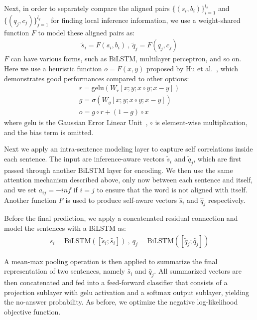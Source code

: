 \documentclass[letterpaper]{article} \usepackage{aaai19}  \usepackage{times}  \usepackage{helvet}  \usepackage{courier}  \usepackage{url}  \usepackage{graphicx}  \usepackage{pbox}
\begin{document}
Next, in order to separately compare the aligned pairs $\{(s_i, b_i)\}_{i=1}^{l_s}$ and $\{(q_j, c_j)\}_{j=1}^{l_q}$ for finding local inference information, we use a weight-shared function $F$ to model these aligned pairs as:
\begin{gather}
	\tilde{s}_i = F(s_i, b_i) \ , \
	\tilde{q}_j = F(q_j, c_j) \nonumber
\end{gather}
$F$ can have various forms, such as BiLSTM, multilayer perceptron, and so on. 
Here we use a heuristic function $o=F(x,y)$ proposed by Hu et al.~, which demonstrates good performances compared to other options:
\begin{gather}
r = \mathrm{gelu} \left(W_r [x; y; x \circ y; x - y] \right) \nonumber \\
g = \sigma \left(W_g [x; y; x \circ y; x - y] \right) \nonumber \\
o = g \circ r  + (1 - g) \circ x \nonumber
\end{gather}
where $\mathrm{gelu}$ is the Gaussian Error Linear Unit~\cite{Hendrycks16}, $\circ$ is element-wise multiplication, and the bias term is omitted. 


Next we apply an intra-sentence modeling layer to capture self correlations inside each sentence.
The input are inference-aware vectors $\tilde{s}_i$ and $\tilde{q}_j$, which are first passed through another BiLSTM layer for encoding.
We then use the same attention mechanism described above, only now between each sentence and itself, and we set $a_{ij}=-inf$ if $i=j$ to ensure that the word is not aligned with itself. 
Another function $F$ is used to produce self-aware vectors $\hat{s}_i$ and $\hat{q}_j$ respectively.

Before the final prediction, we apply a concatenated residual connection and model the sentences with a BiLSTM as:
\begin{eqnarray} 
	\bar{s}_i=\mathrm{BiLSTM}([\tilde{s}_i;\hat{s}_i])	\ , \ 
	\bar{q}_j=\mathrm{BiLSTM}([\tilde{q}_j;\hat{q}_j])   \nonumber
\end{eqnarray}

A mean-max pooling operation is then applied to summarize the final representation of two sentences, namely $\bar{s}_i$ and $\bar{q}_j$.
All summarized vectors are then concatenated and fed into a feed-forward classifier that consists of a projection sublayer with $\mathrm{gelu}$ activation and a $\mathrm{softmax}$ output sublayer, yielding the no-answer probability. 
As before, we optimize the negative log-likelihood objective function.
\end{document}

